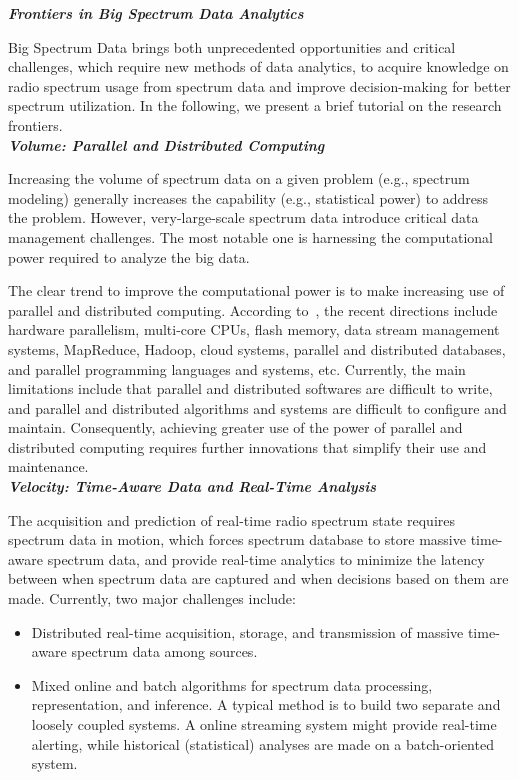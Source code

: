 \documentclass[12pt,draftcls,journal,letterpaper,oneside,onecolumn]{IEEEtran}
\begin{document}
\textbf{\emph{Frontiers in Big Spectrum Data Analytics}}

Big Spectrum Data brings both unprecedented opportunities and critical challenges, which require new methods of data analytics, to acquire knowledge on radio spectrum usage from spectrum data and improve decision-making for better spectrum utilization. In the following, we present a brief tutorial on the research frontiers.
\\






\textbf{\emph{Volume: Parallel and Distributed Computing}}

Increasing the volume of spectrum data on a given problem (e.g., spectrum modeling) generally increases the capability (e.g., statistical power) to address the problem. However, very-large-scale spectrum data introduce critical data management challenges. The most notable one is harnessing the computational power required to analyze the big data.

The clear trend to improve the computational power is to make increasing use of parallel and distributed computing. According to~\cite{Frontiers}, the recent directions include hardware parallelism, multi-core CPUs, flash memory, data stream management systems, MapReduce, Hadoop, cloud systems, parallel and distributed databases, and parallel programming languages and systems, etc. Currently, the main limitations include that parallel and distributed softwares are difficult to write, and parallel and distributed algorithms and systems are difficult to configure and maintain. Consequently, achieving greater use of the power of parallel and distributed computing requires further innovations that simplify their use and maintenance.
\\

\textbf{\emph{Velocity: Time-Aware Data and Real-Time Analysis}}

The acquisition and prediction of real-time radio spectrum state requires spectrum data in motion, which forces spectrum database to store massive time-aware spectrum data, and provide real-time analytics to minimize the latency between when spectrum data are captured and when decisions based on them are made. Currently, two major challenges include:
\begin{itemize}
  \item Distributed real-time acquisition, storage, and transmission of massive time-aware spectrum data among sources.
  \item Mixed online and batch algorithms for spectrum data processing, representation, and inference. A typical method is to build two separate and loosely coupled systems. A online streaming system might provide real-time alerting, while historical (statistical) analyses are made on a batch-oriented system.
      \\
\end{itemize}
\end{document}
